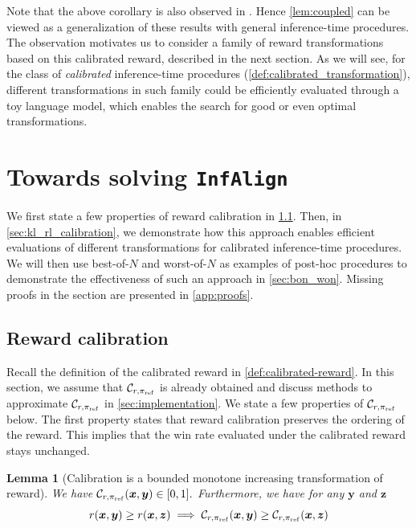 \documentclass{article}
\newcommand{\by}{{\bm{y}}}
\newcommand{\bx}{{\bm{x}}}
\newcommand{\bz}{{\bm{z}}}
\newcommand{\bp}{{\pi_{\rm ref}}} %
\newcommand{\iapo}{\texttt{InfAlign}\xspace}
\newcommand{\car}{\mathcal{C}} %
\newtheorem{lemma}{Lemma}
\begin{document}
%
Note that the above corollary is also observed in \citet{azar2023general,gui2024bonbonalignmentlargelanguage}. Hence \cref{lem:coupled} can be viewed as a generalization of these results with general inference-time procedures.
The observation motivates us to  consider a family of reward transformations based on this calibrated reward,
%
%
%
described in the
next section. As we will see, for the class of \textit{calibrated} inference-time procedures (\cref{def:calibrated_transformation}), different transformations in such family could be efficiently evaluated through a toy language model, which enables the search for good or even optimal transformations.
%

%

%



\section{Towards solving \iapo} \label{sec:ctrl}

%

We first state a few properties of reward calibration in \cref{sec:reward_calibration}. Then, in \cref{sec:kl_rl_calibration}, we demonstrate how this approach enables efficient evaluations of different transformations for calibrated inference-time procedures. 
%
%
We will then use best-of-$N$ and worst-of-$N$ as examples of post-hoc procedures to demonstrate the effectiveness of such an approach in \cref{sec:bon_won}. Missing proofs in the section are presented in \cref{app:proofs}.

\subsection{Reward calibration}
\label{sec:reward_calibration}
%
%
%




%

%
%
%
%
%
%
%
%
%
%
%
%
%
Recall the definition of the calibrated reward in \cref{def:calibrated-reward}.
%
In this section, we assume that  $\car_{r, \bp}$ is already obtained and discuss methods to approximate $\car_{r, \bp}$ in \cref{sec:implementation}.
We state a few properties of $\car_{r, \bp}$ below. %
The first property states that reward calibration preserves the ordering of the reward. This implies that the win rate evaluated under the calibrated reward stays unchanged. %
\begin{lemma}[Calibration is a bounded monotone increasing transformation of reward] \label{lem:monotone}
We have $\car_{r, \bp}(\bx, \by) \in [0,1].$ Furthermore, we have for any $\by$ and $\bz$ \begin{equation}
    r(\bx, \by) \geq r(\bx, \bz) \implies \car_{r, \bp}(\bx, \by) \geq \car_{r, \bp}(\bx, \bz)
\end{equation}
\end{lemma}
\end{document}
